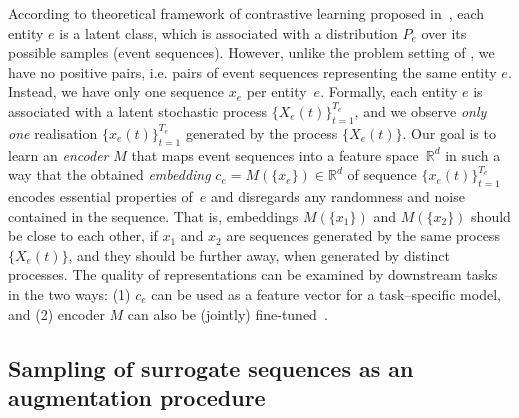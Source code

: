 \documentclass[sigconf]{acmart}
\newcommand{\R}{\mathbb{R}}
\begin{document}
According to theoretical framework of contrastive learning proposed in~\cite{Saunshi2019ICML}, each entity $e$ is a latent class, which is associated with a distribution $P_e$ over its possible samples (event sequences). However, unlike the problem setting of  \cite{Saunshi2019ICML}, we have no positive pairs, i.e. pairs of event sequences representing the same entity $e$. Instead, we have only one sequence $x_e$ per entity~$e$. Formally, each entity $e$ is associated with a latent stochastic process $\{X_e(t)\}_{t=1}^{T_e}$, and we observe {\it only one} realisation $\{x_e(t)\}_{t=1}^{T_e}$ generated by the process $\{X_e(t)\}$. Our goal is to learn an \textit{encoder} $M$ that maps event sequences into a feature space~$\R^d$ in such a way that the obtained \textit{embedding} $c_e=M(\{x_e\})\in \R^d$ of sequence $\{x_e(t)\}^{T_e}_{t=1}$ encodes essential properties of~$e$ and disregards any randomness and noise contained in the sequence. That is, embeddings $M(\{x_1\})$ and $M(\{x_2\})$ should be close to each other, if $x_1$ and $x_2$ are sequences generated by the same process $\{X_e(t)\}$, and they should be further away, when generated by distinct processes. The quality of representations can be examined by downstream tasks %
in the two ways: (1) $c_e$ can be used as a feature vector for a task--specific model, and (2) encoder $M$ can also be (jointly) fine-tuned~\citep{Yosinski2014HowTA}.

\subsection{Sampling of surrogate sequences as an augmentation procedure} \label{sec-pos-pairs}
\end{document}
